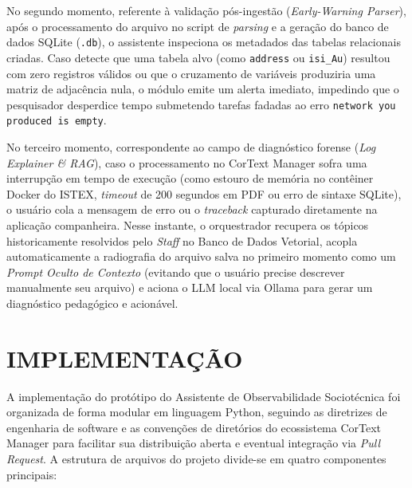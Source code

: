 \documentclass[
	oneside,
	a4paper,
	12pt,
	chapter=TITLE,
	section=TITLE,
	english,
	brazilian
]{abntex2}
\begin{document}
No segundo momento, referente à validação pós-ingestão (\textit{Early-Warning Parser}), após o processamento do arquivo no script de \textit{parsing} e a geração do banco de dados SQLite (\texttt{.db}), o assistente inspeciona os metadados das tabelas relacionais criadas. Caso detecte que uma tabela alvo (como \texttt{address} ou \texttt{isi\_\allowbreak Au}) resultou com zero registros válidos ou que o cruzamento de variáveis produziria uma matriz de adjacência nula, o módulo emite um alerta imediato, impedindo que o pesquisador desperdice tempo submetendo tarefas fadadas ao erro \texttt{network you produced is empty}.

No terceiro momento, correspondente ao campo de diagnóstico forense (\textit{Log Explainer \& RAG}), caso o processamento no CorText Manager sofra uma interrupção em tempo de execução (como estouro de memória no contêiner Docker do ISTEX, \textit{timeout} de 200 segundos em PDF ou erro de sintaxe SQLite), o usuário cola a mensagem de erro ou o \textit{traceback} capturado diretamente na aplicação companheira. Nesse instante, o orquestrador recupera os tópicos historicamente resolvidos pelo \textit{Staff} no Banco de Dados Vetorial, acopla automaticamente a radiografia do arquivo salva no primeiro momento como um \textit{Prompt Oculto de Contexto} (evitando que o usuário precise descrever manualmente seu arquivo) e aciona o LLM local via Ollama para gerar um diagnóstico pedagógico e acionável.

\FloatBarrier
\section{IMPLEMENTAÇÃO}\label{sec:implementacao}


A implementação do protótipo do Assistente de Observabilidade Sociotécnica foi organizada de forma modular em linguagem Python, seguindo as diretrizes de engenharia de software e as convenções de diretórios do ecossistema CorText Manager para facilitar sua distribuição aberta e eventual integração via \textit{Pull Request}. A estrutura de arquivos do projeto divide-se em quatro componentes principais:
\end{document}
